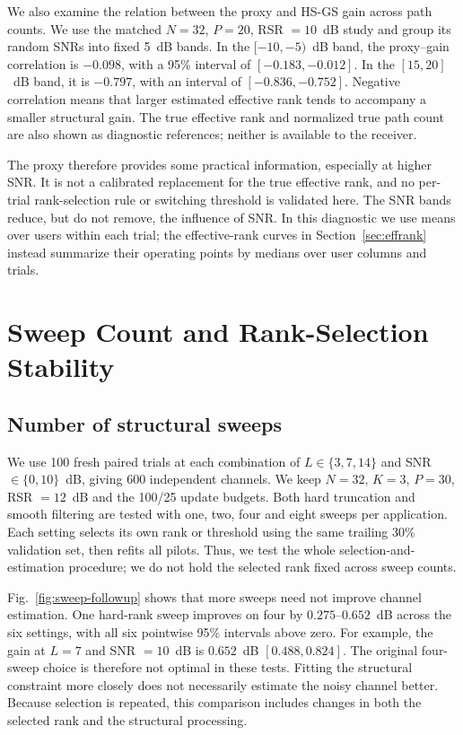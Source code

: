 \documentclass[journal]{IEEEtran}
\begin{document}
We also examine the relation between the proxy and HS-GS gain across
path counts. We use the matched $N=32$, $P=20$, RSR $=10$~dB study and
group its random SNRs into fixed 5~dB bands. In the $[-10,-5)$~dB band,
the proxy--gain correlation is $-0.098$, with a 95\% interval of
$[-0.183,-0.012]$. In the $[15,20]$~dB band, it is $-0.797$, with an
interval of $[-0.836,-0.752]$. Negative correlation means that larger
estimated effective rank tends to accompany a smaller structural gain.
The true effective rank and normalized true path count are also shown
as diagnostic references; neither is available to the receiver.

The proxy therefore provides some practical information, especially at
higher SNR. It is not a calibrated replacement for the true effective
rank, and no per-trial rank-selection rule or switching threshold is
validated here. The SNR bands reduce, but do not remove, the influence
of SNR. In this diagnostic we use means over users within each trial;
the effective-rank curves in Section~\ref{sec:effrank} instead summarize their operating
points by medians over user columns and trials.




\section{Sweep Count and Rank-Selection Stability}
\label{app:followup}

\subsection{Number of structural sweeps}

We use 100 fresh paired trials at each combination of $L\in\{3,7,14\}$
and SNR $\in\{0,10\}$~dB, giving 600 independent channels. We keep
$N=32$, $K=3$, $P=30$, RSR $=12$~dB and the 100/25 update budgets.
Both hard truncation and smooth filtering are tested with one, two,
four and eight sweeps per application. Each setting selects its own rank
or threshold using the same trailing 30\% validation set, then refits
all pilots. Thus, we test the whole selection-and-estimation procedure;
we do not hold the selected rank fixed across sweep counts.

Fig.~\ref{fig:sweep-followup} shows that more sweeps need not improve
channel estimation. One hard-rank sweep improves on four by
$0.275$--$0.652$~dB across the six settings, with all six pointwise 95\%
intervals above zero. For example, the gain at $L=7$ and SNR $=10$~dB
is $0.652$~dB $[0.488,0.824]$. The original four-sweep choice is
therefore not optimal in these tests. Fitting the structural constraint
more closely does not necessarily estimate the noisy channel better.
Because selection is repeated, this comparison includes changes in both
the selected rank and the structural processing.
\end{document}

